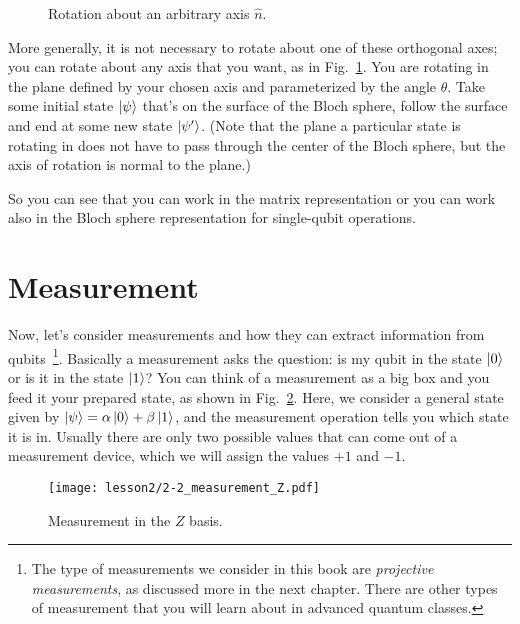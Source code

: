 \begin{figure}[H]
    
    \caption{Rotation about an arbitrary axis $\hat{n}$.}
    
    \label{fig:arb-rot}
\end{figure}

More generally, it is not necessary to rotate about one of these orthogonal axes; you can rotate about any axis that you want, as in Fig.~\ref{fig:arb-rot}. You are rotating in the plane defined by your chosen axis and parameterized by the angle $\theta$. Take some initial state $\left| \psi \right\rangle$ that's on the surface of the Bloch sphere, follow the surface and end at some new state $\left| \psi' \right\rangle$.  (Note that the plane a particular state is rotating in does not have to pass through the center of the Bloch sphere, but the axis of rotation is normal to the plane.) 

So you can see that you can work in the matrix representation or you can work also in the Bloch sphere representation for single-qubit operations.



\section{Measurement}
\label{sec:measurement}

Now, let's consider measurements and how they can extract information from qubits~\footnote{The type of measurements we consider in this book are \emph{projective measurements}, as discussed more in the next chapter. There are other types of measurement that you will learn about in advanced quantum classes.}. Basically a measurement asks the question: is my qubit in the state $\left| 0 \right\rangle$ or is it in the state $\left| 1 \right\rangle$? You can think of a measurement as a big box and you feed it your prepared state, as shown in Fig.~\ref{fig:z-measure}. Here, we consider a general state given by $\left| \psi \right\rangle = \alpha\left| 0 \right\rangle+\beta\left| 1 \right\rangle$, and the measurement operation tells you which state it is in. Usually there are only two possible values that can come out of a measurement device, which we will assign the values $+1$ and $-1$.

\begin{figure}[H]
    \centering
    \texttt{[image: lesson2/2-2\_measurement\_Z.pdf]}
    \caption{Measurement in the $Z$ basis.}
    \label{fig:z-measure}
\end{figure}

